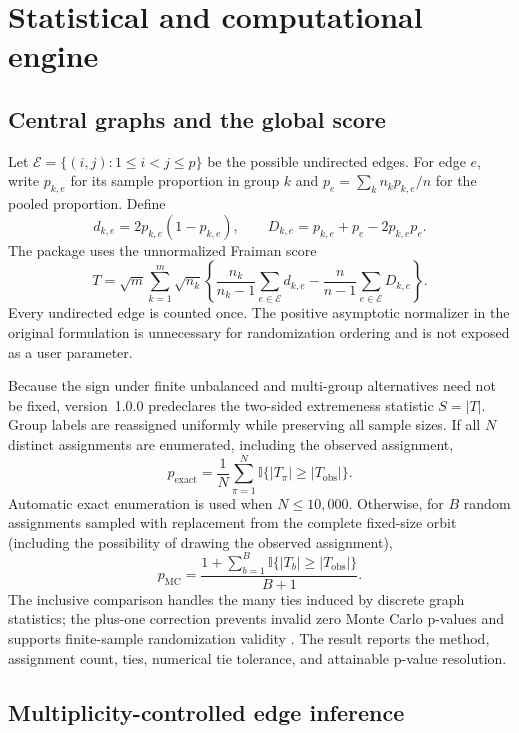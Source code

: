 \documentclass[article]{jss}\usepackage[]{graphicx}\usepackage[]{xcolor}
\begin{document}
\section{Statistical and computational engine}
\label{sec:methods}

\subsection{Central graphs and the global score}

Let $\mathcal E=\{(i,j):1\leq i<j\leq p\}$ be the possible undirected edges.
For edge $e$, write $p_{k,e}$ for its sample proportion in group $k$ and
$p_e=\sum_kn_kp_{k,e}/n$ for the pooled proportion. Define
\[
d_{k,e}=2p_{k,e}(1-p_{k,e}),\qquad
D_{k,e}=p_{k,e}+p_e-2p_{k,e}p_e.
\]
The package uses the unnormalized Fraiman score
\begin{equation}
T=\sqrt m\sum_{k=1}^m\sqrt{n_k}
\left\{
\frac{n_k}{n_k-1}\sum_{e\in\mathcal E}d_{k,e}
-
\frac{n}{n-1}\sum_{e\in\mathcal E}D_{k,e}
\right\}.
\label{eq:score}
\end{equation}
Every undirected edge is counted once. The positive asymptotic normalizer in
the original formulation is unnecessary for randomization ordering and is not
exposed as a user parameter.

Because the sign under finite unbalanced and multi-group alternatives need not
be fixed, version~1.0.0 predeclares the two-sided extremeness statistic
$S=|T|$. Group labels are reassigned uniformly while preserving all sample
sizes. If all $N$ distinct assignments are enumerated, including the observed
assignment,
\[
p_{\mathrm{exact}} =
\frac{1}{N}\sum_{\pi=1}^N
\mathbb I\{|T_\pi|\geq|T_{\mathrm{obs}}|\}.
\]
Automatic exact enumeration is used when $N\leq10{,}000$. Otherwise, for $B$
random assignments sampled with replacement from the complete fixed-size
orbit (including the possibility of drawing the observed assignment),
\begin{equation}
p_{\mathrm{MC}} =
\frac{1+\sum_{b=1}^B
\mathbb I\{|T_b|\geq|T_{\mathrm{obs}}|\}}{B+1}.
\label{eq:mc}
\end{equation}
The inclusive comparison handles the many ties induced by discrete graph
statistics; the plus-one correction prevents invalid zero Monte Carlo
p-values and supports finite-sample randomization validity
\citep{PhipsonSmyth2010,HemerikGoeman2018}. The result reports the method,
assignment count, ties, numerical tie tolerance, and attainable p-value
resolution.

\subsection{Multiplicity-controlled edge inference}
\end{document}

